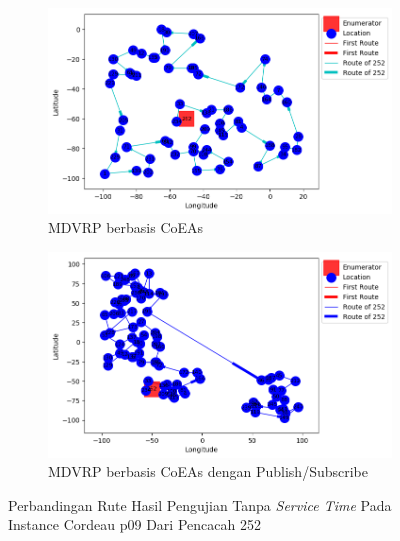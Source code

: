 \begin{figure}[H]
	\centering
	\begin{subfigure}[t]{\textwidth}
		\centering
		\includegraphics[width=\textwidth]{Resources/Images/cordeau_p09/cordeau_p09_notw_252_coes}
		\caption{MDVRP berbasis CoEAs}
		\label{fig:cordeau_p09_notw_252_coes}
	\end{subfigure}
	\begin{subfigure}[t]{\textwidth}
		\centering
		\includegraphics[width=\textwidth]{Resources/Images/cordeau_p09/cordeau_p09_notw_252_pubsub_coes}
		\caption{MDVRP berbasis CoEAs dengan Publish/Subscribe}
		\label{fig:cordeau_p09_notw_252_pubsub_coes}
	\end{subfigure}
	\caption{Perbandingan Rute Hasil Pengujian Tanpa \textit{Service Time} Pada Instance Cordeau p09 Dari Pencacah 252}
	\label{fig:cordeau_p09_notw_252}
\end{figure}



